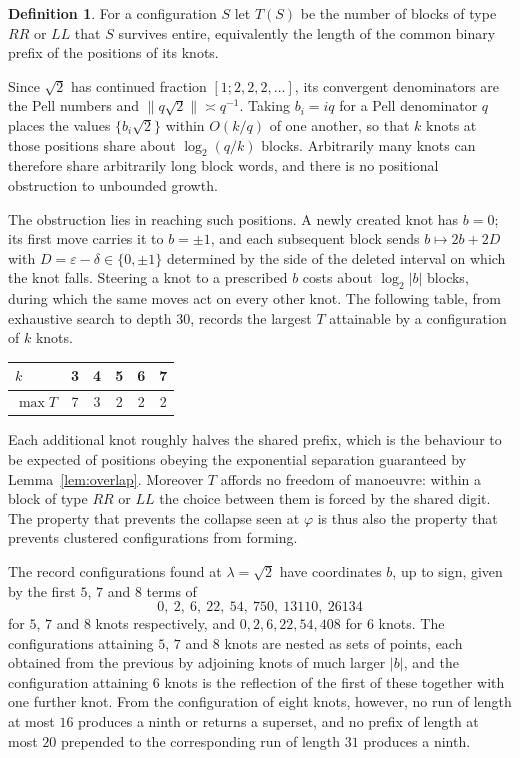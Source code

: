 \documentclass[11pt,reqno]{amsart}
\theoremstyle{plain}
\theoremstyle{definition}
\newtheorem{definition}[theorem]{Definition}
\theoremstyle{remark}
\newcommand{\fp}[1]{\{#1\}}
\begin{document}
\begin{definition}
For a configuration $S$ let $T(S)$ be the number of blocks of type $RR$ or $LL$
that $S$ survives entire, equivalently the length of the common binary prefix of
the positions of its knots.
\end{definition}

Since $\sqrt2$ has continued fraction $[1;2,2,2,\dots]$, its convergent
denominators are the Pell numbers and $\|q\sqrt2\|\asymp q^{-1}$. Taking
$b_i=iq$ for a Pell denominator $q$ places the values $\fp{b_i\sqrt2}$ within
$O(k/q)$ of one another, so that $k$ knots at those positions share about
$\log_2(q/k)$ blocks. Arbitrarily many knots can therefore share arbitrarily
long block words, and there is no positional obstruction to unbounded growth.

The obstruction lies in reaching such positions. A newly created knot has
$b=0$; its first move carries it to $b=\pm1$, and each subsequent block sends
$b\mapsto2b+2D$ with $D=\varepsilon-\delta\in\{0,\pm1\}$ determined by the side
of the deleted interval on which the knot falls. Steering a knot to a prescribed
$b$ costs about $\log_2|b|$ blocks, during which the same moves act on every
other knot. The following table, from exhaustive search to depth $30$, records
the largest $T$ attainable by a configuration of $k$ knots.

\begin{center}
\begin{tabular}{lccccc}
\toprule
$k$ & 3 & 4 & 5 & 6 & 7\\
\midrule
$\max T$ & 7 & 3 & 2 & 2 & 2\\
\bottomrule
\end{tabular}
\end{center}

Each additional knot roughly halves the shared prefix, which is the behaviour to
be expected of positions obeying the exponential separation guaranteed by
Lemma~\ref{lem:overlap}. Moreover $T$ affords no freedom of manoeuvre: within a
block of type $RR$ or $LL$ the choice between them is forced by the shared
digit. The property that prevents the collapse seen at $\varphi$ is thus also
the property that prevents clustered configurations from forming.

The record configurations found at $\lambda=\sqrt2$ have coordinates $b$, up to
sign, given by the first $5$, $7$ and $8$ terms of
\[
  0,\ 2,\ 6,\ 22,\ 54,\ 750,\ 13110,\ 26134
\]
for $5$, $7$ and $8$ knots respectively, and $0,2,6,22,54,408$ for $6$ knots.
The configurations attaining $5$, $7$ and $8$ knots are nested as sets of
points, each obtained from the previous by adjoining knots of much larger
$|b|$, and the configuration attaining $6$ knots is the reflection of the first
of these together with one further knot. From the configuration of eight knots,
however, no run of length at most $16$ produces a ninth or returns a superset,
and no prefix of length at most $20$ prepended to the corresponding run of
length $31$ produces a ninth.
\end{document}
